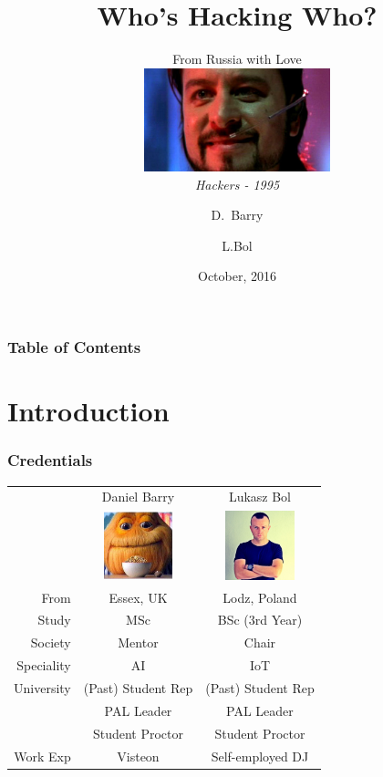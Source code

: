 \documentclass[10pt]{beamer}
\title{Who's Hacking Who?}
\subtitle{
  From Russia with Love
  \vspace{0.5cm}
  \\
  \includegraphics[height=3cm,keepaspectratio]{hackers.jpg}
  \\
  \scriptsize{\emph{Hackers - 1995}}
}
\author[UH CSS]{D.~Barry\inst{1} \and L.Bol\inst{1}}
\institute{
  \inst{1}
  Computer Science Society
  \\
  University of Hertforshire
}
\date{October, 2016}
\begin{document}
  \frame{\titlepage}
  \begin{frame}
    \frametitle{Table of Contents}
    \begin{block}{}
      \vspace{0.5cm}
      \tableofcontents
      \vspace{0.5cm}
    \end{block}
  \end{frame}
  \section[Intro]{Introduction}
  \begin{frame}
    \frametitle{Credentials}
    \centering
    \begin{tabular}{| r | c | c |}
      \hline
                 & Daniel Barry                                            & Lukasz Bol     \\
                 & \includegraphics[width=2cm,keepaspectratio]{dbarry.jpg} & \includegraphics[width=2cm,keepaspectratio]{lbol.jpg} \\
      \hline
      From       & Essex, UK                                               & Lodz, Poland                                          \\
      Study      & MSc                                                     & BSc (3rd Year)                                        \\
      Society    & Mentor                                                  & Chair                                                 \\
      Speciality & AI                                                      & IoT                                                   \\
      University & (Past) Student Rep                                      & (Past) Student Rep                                    \\
                 & PAL Leader                                              & PAL Leader                                            \\
                 & Student Proctor                                         & Student Proctor                                       \\
      Work Exp   & Visteon                                                 & Self-employed DJ                                      \\
      \hline
    \end{tabular}
  \end{frame}
\end{document}
